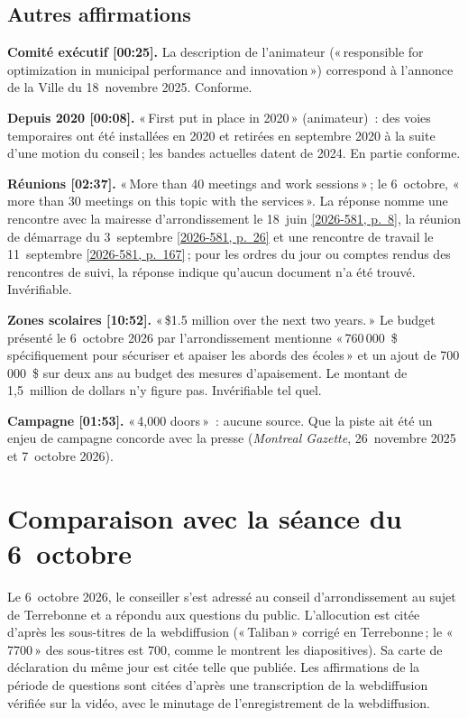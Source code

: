 \documentclass[11pt,letterpaper]{article}
\newcommand{\pagesurl}{https://openmobilitydata.github.io/Terrebonne-access-requests}
\newcommand{\cliptime}[1]{\textsf{\small[#1]}}
\newcommand{\pgl}[2]{\href{\pagesurl/2026-581/raw/01_emails_mandate_counts.pdf\#page=#1}{\textsf{\small[2026-581, p.~#2]}}}
\newcommand{\pg}[1]{\pgl{#1}{#1}}
\newif\ifqa\qatrue
\begin{document}
\subsection{Autres affirmations}

\textbf{Comité exécutif \cliptime{00:25}.} La description de l'animateur
(«\,responsible for optimization in municipal performance and
innovation\,») correspond à l'annonce de la Ville du 18~novembre 2025.
Conforme.

\textbf{Depuis 2020 \cliptime{00:08}.} «\,First put in place in 2020\,»
(animateur)~: des voies temporaires ont été installées en 2020 et retirées
en septembre 2020 à la suite d'une motion du conseil\,; les bandes
actuelles datent de 2024. En partie conforme.

\textbf{Réunions \cliptime{02:37}.} «\,More than 40 meetings and work
sessions\,»\,; le 6~octobre, «\,more than 30 meetings on this topic with
the services\,». La réponse nomme une rencontre avec la mairesse
d'arrondissement le 18~juin \pg{8}, la réunion de démarrage du
3~septembre \pg{26} et une rencontre de travail le 11~septembre \pg{167}\,;
pour les ordres du jour ou comptes rendus des rencontres de suivi, la
réponse indique qu'aucun document n'a été trouvé. Invérifiable.

\textbf{Zones scolaires \cliptime{10:52}.} «\,\$1.5 million over the next
two years.\,» Le budget présenté le 6~octobre 2026 par
l'arrondissement mentionne «\,760\,000~\$ spécifiquement pour sécuriser et apaiser les abords
des écoles\,» et un ajout de 700\,000~\$ sur deux ans au budget des mesures
d'apaisement. Le montant de 1,5~million de dollars n'y figure pas.
Invérifiable tel quel.

\textbf{Campagne \cliptime{01:53}.} «\,4,000 doors\,»~: aucune source. Que
la piste ait été un enjeu de campagne concorde avec la presse
(\emph{Montreal Gazette}, 26~novembre 2025 et 7~octobre 2026).

\section{Comparaison avec la séance du 6~octobre}

Le 6~octobre 2026, le conseiller s'est adressé au conseil d'arrondissement
au sujet de Terrebonne et a répondu aux questions du public. L'allocution
est citée d'après les sous-titres de la webdiffusion («\,Taliban\,» corrigé
en Terrebonne\,; le «\,7700\,» des sous-titres est 700, comme le montrent
les diapositives). Sa carte de déclaration du même jour est citée telle que
publiée. \ifqa Les affirmations de la période de questions sont citées
d'après une transcription de la webdiffusion vérifiée sur la vidéo, avec
le minutage de l'enregistrement de la webdiffusion.\else Les affirmations de la période de questions ne
sont pas utilisées ici~: la transcription de la webdiffusion n'a pas encore
été vérifiée sur la vidéo.\fi
\end{document}
